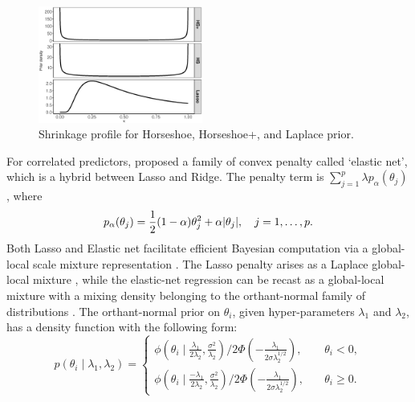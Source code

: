 \documentclass[11pt]{article}
\begin{document}
\begin{figure}[!ht]
\centering
\includegraphics[width=0.48\textwidth]{prior_diff_kappa}
\caption{\footnotesize{Shrinkage profile for Horseshoe, Horseshoe+, and Laplace prior.}}
\label{fig:priorkappa}
\end{figure}

For correlated predictors, \cite{zou2005regularization} proposed a family of
convex penalty called `elastic net', which is a hybrid between Lasso and Ridge.
The penalty term is $\sum_{j=1}^{p} \lambda p_{\alpha}(\theta_j)$, where 
\[
p_{\alpha}(\theta_j) = \frac{1}{2} (1-\alpha)\theta_j^2 + \alpha \lvert\theta_j\rvert, \quad j = 1, \ldots, p. 
\]
Both Lasso and Elastic net facilitate efficient Bayesian computation via a
global-local scale mixture representation \citep{bhadra2016global}. The Lasso
penalty arises as a Laplace global-local mixture \citep{andrews1974scale},
while the elastic-net regression can be recast as a global-local mixture with a
mixing density belonging to the orthant-normal family of distributions
\citep{hans2011elastic}.  The orthant-normal prior on $\theta_i$, given
hyper-parameters $\lambda_1$ and $\lambda_2$, has a density function with the
following form:
\begin{equation}
  p(\theta_i \mid \lambda_1, \lambda_2)  = 
  \begin{cases} 
   \phi(\theta_i \mid \frac{\lambda_1}{2\lambda_2}, \frac{\sigma^2}{\lambda_2}) / 2\Phi\left(-\frac{\lambda_1}{2\sigma \lambda_2^{1/2} }\right), & \quad \theta_i < 0, \\
   \phi(\theta_i \mid \frac{-\lambda_1}{2\lambda_2}, \frac{\sigma^2}{\lambda_2}) / 2\Phi\left(-\frac{\lambda_1}{2\sigma \lambda_2^{1/2} }\right), & \quad \theta_i \geq 0. \end{cases} 
  \label{eq:hans}
\end{equation}
 
\end{document}
